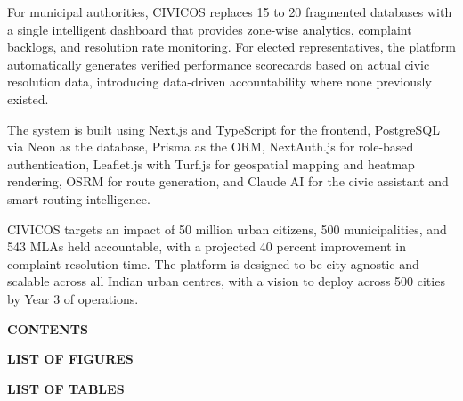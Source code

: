 \documentclass[12pt,a4paper]{report}
\begin{document}
For municipal authorities, CIVICOS replaces 15 to 20 fragmented databases with
a single intelligent dashboard that provides zone-wise analytics, complaint
backlogs, and resolution rate monitoring. For elected representatives, the
platform automatically generates verified performance scorecards based on actual
civic resolution data, introducing data-driven accountability where none
previously existed.

The system is built using Next.js and TypeScript for the frontend, PostgreSQL
via Neon as the database, Prisma as the ORM, NextAuth.js for role-based
authentication, Leaflet.js with Turf.js for geospatial mapping and heatmap
rendering, OSRM for route generation, and Claude AI for the civic assistant and
smart routing intelligence.

CIVICOS targets an impact of 50 million urban citizens, 500 municipalities, and
543 MLAs held accountable, with a projected 40 percent improvement in complaint
resolution time. The platform is designed to be city-agnostic and scalable
across all Indian urban centres, with a vision to deploy across 500 cities by
Year 3 of operations.

\newpage

\newpage
\thispagestyle{empty}
\begin{center}
{\bfseries\fontsize{16}{19}\selectfont CONTENTS}
\end{center}
\tableofcontents

\newpage
\thispagestyle{empty}
\begin{center}
{\bfseries\fontsize{16}{19}\selectfont LIST OF FIGURES}
\end{center}
\listoffigures

\newpage
\thispagestyle{empty}
\begin{center}
{\bfseries\fontsize{16}{19}\selectfont LIST OF TABLES}
\end{center}
\listoftables

\clearpage
{}
\setcounter{page}{1}
\pagestyle{plain}
\end{document}

